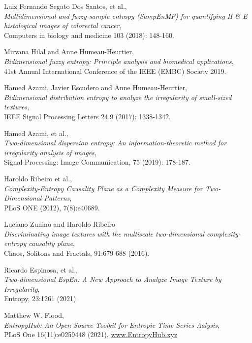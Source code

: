 \documentclass[12pt, a4paper, titlepage, openany]{book}
\begin{document}
\begin{thebibliography}{9}
Luiz Fernando Segato Dos Santos, et al.,\\
\emph{Multidimensional and fuzzy sample entropy (SampEnMF) for quantifying H \& E histological images of colorectal cancer},\\
Computers in biology and medicine  103 (2018): 148-160.

Mirvana Hilal and Anne Humeau-Heurtier,\\
\emph{Bidimensional fuzzy entropy: Principle analysis and biomedical applications},\\
41st Annual International Conference of the IEEE (EMBC) Society 2019.

Hamed Azami, Javier Escudero and Anne Humeau-Heurtier,\\
\emph{Bidimensional distribution entropy to analyze the irregularity of small-sized textures},\\
IEEE Signal Processing Letters 24.9 (2017): 1338-1342.

Hamed Azami, et al.,\\
\emph{Two-dimensional dispersion entropy: An information-theoretic method for irregularity analysis of images},\\
Signal Processing: Image Communication, 75 (2019): 178-187.

Haroldo Ribeiro et al.,\\
\emph{Complexity-Entropy Causality Plane as a Complexity Measure for Two-Dimensional Patterns},\\
PLoS ONE (2012), 7(8):e40689.

Luciano Zunino and Haroldo Ribeiro\\
\emph{Discriminating image textures with the multiscale two-dimensional complexity-entropy causality plane},\\
Chaos, Solitons and Fractals,  91:679-688 (2016).

Ricardo Espinosa, et al.,\\
\emph{Two-dimensional EspEn: A New Approach to Analyze Image Texture by Irregularity},\\
Entropy, 23:1261 (2021)




Matthew W. Flood,\\
\emph{EntropyHub: An Open-Source Toolkit for Entropic Time Series Aalysis},\\
PLoS One 16(11):e0259448 (2021).
\href{www.EntropyHub.xyz}{www.EntropyHub.xyz}

\end{thebibliography}
\end{document}
